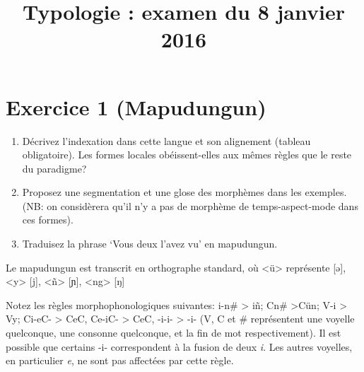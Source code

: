 \documentclass[oldfontcommands,twoside,a4paper,12pt]{article}
\begin{document}
\title{Typologie : examen du 8 janvier 2016}
\date{}
\maketitle
 

\section*{Exercice 1 (Mapudungun)}

\begin{enumerate}
\item Décrivez l'indexation dans cette langue et son alignement (tableau obligatoire). Les formes locales obéissent-elles aux mêmes règles que le reste du paradigme?
\item Proposez une segmentation et une glose des morphèmes dans les exemples. (NB: on considèrera qu'il n'y a pas de morphème de temps-aspect-mode dans ces formes).
\item Traduisez la phrase `Vous deux l'avez vu' en mapudungun.
\end{enumerate}
Le mapudungun est transcrit en orthographe standard, où <ü> représente [ə], <y> [j], <ñ> [ɲ], <ng> [ŋ]

Notez les règles morphophonologiques suivantes: i-n\# > iñ; Cn\# >Cün; V-i > Vy; Ci-eC- > CeC, Ce-iC- > CeC, -i-i- > -i- (V, C et \# représentent une voyelle quelconque, une consonne quelconque, et la fin de mot respectivement). Il est possible que certains -i- correspondent à la fusion de deux \textit{i}. Les autres voyelles, en particulier \textit{e}, ne sont pas affectées par cette règle.
\end{document}
